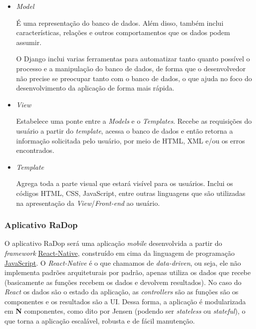\begin{itemize}



\item{\emph{Model}}\label{model}

É uma representação do banco de dados. Além disso, também inclui
características, relações e outros comportamentos que os dados podem
assumir.

O Django inclui varias ferramentas para automatizar tanto quanto
possível o processo e a manipulação do banco de dados, de forma que o
desenvolvedor não precise se preocupar tanto com o banco de dados, o que
ajuda no foco do desenvolvimento da aplicação de forma mais rápida.

\item{\emph{View}}\label{view}

Estabelece uma ponte entre a \emph{Models} e o \emph{Templates}. Recebe
as requisições do usuário a partir do \emph{template}, acessa o banco de
dados e então retorna a informação solicitada pelo usuário, por meio de
HTML, XML e/ou os erros encontrados.

\item{\emph{Template}}\label{template}

Agrega toda a parte visual que estará visível para os usuários. Inclui
os códigos HTML, CSS, JavaScript, entre outras linguagens que são
utilizadas na apresentação da \emph{View}/\emph{Front-end} ao usuário.

\end{itemize}


\subsubsection{Aplicativo RaDop}\label{aplicativo-radop}

O aplicativo RaDop será uma aplicação \emph{mobile} desenvolvida a partir do
\emph{framework} \href{https://facebook.github.io/react-native/}{React-Native}, construído em cima da
linguagem de programação \href{https://www.javascript.com/}{JavaScript}. O
\emph{React-Native} é o que chamamos de \emph{data-driven}, ou seja, ele não
implementa padrões arquiteturais por padrão, apenas utiliza os dados que
recebe (basicamente as funções recebem os dados e devolvem resultados).
No caso do \emph{React} os dados são o estado da aplicação, as \emph{controllers} são
as funções são os componentes e os resultados são a UI. Dessa forma, a
aplicação é modularizada em \textbf{N} componentes, como dito por Jensen \cite{jensen2018} (podendo ser
\emph{stateless} ou \emph{stateful}), o que torna a aplicação escalável,
robusta e de fácil manutenção.


